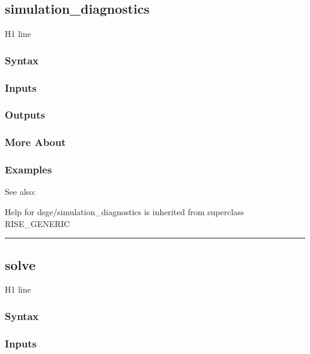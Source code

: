 \documentclass[letterpaper,10pt,english]{sphinxmanual}
\begin{document}
\subsection{simulation\_diagnostics}
\label{classes/models/@dsge/dsge:simulation-diagnostics}\label{classes/models/@dsge/dsge:id173}
H1 line


\subsubsection{Syntax}
\label{classes/models/@dsge/dsge:id174}

\subsubsection{Inputs}
\label{classes/models/@dsge/dsge:id175}

\subsubsection{Outputs}
\label{classes/models/@dsge/dsge:id176}

\subsubsection{More About}
\label{classes/models/@dsge/dsge:id177}

\subsubsection{Examples}
\label{classes/models/@dsge/dsge:id178}
See also:

Help for dsge/simulation\_diagnostics is inherited from superclass RISE\_GENERIC


\bigskip\hrule{}\bigskip



\subsection{solve}
\label{classes/models/@dsge/dsge:solve}\label{classes/models/@dsge/dsge:id179}
H1 line


\subsubsection{Syntax}
\label{classes/models/@dsge/dsge:id180}

\subsubsection{Inputs}
\label{classes/models/@dsge/dsge:id181}
\end{document}
